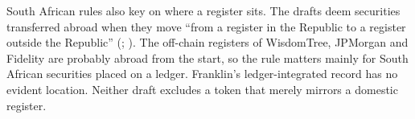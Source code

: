 \documentclass[12pt,a4paper]{article}
\begin{document}

South African rules also key on where a register sits. The drafts deem securities transferred abroad when they move ``from a register in the Republic to a register outside the Republic'' (\citealp[reg~1(1), p.~5]{NT2026CFMDraft}; \citealp[A.1, p.~10, in equivalent terms]{SARB2026CryptoManual}). The off-chain registers of WisdomTree, JPMorgan and Fidelity are probably abroad from the start, so the rule matters mainly for South African securities placed on a ledger. Franklin's ledger-integrated record has no evident location. Neither draft excludes a token that merely mirrors a domestic register.

\end{document}
